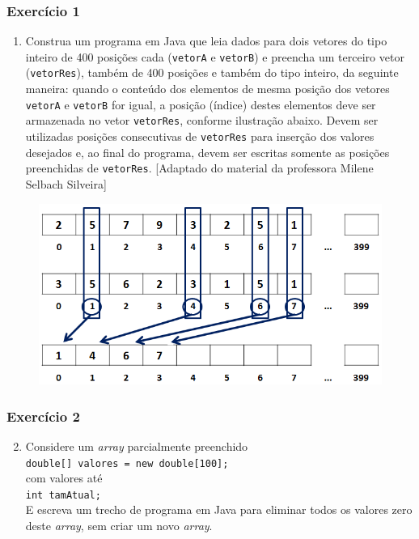 \documentclass[xcolor={dvipsnames,table},aspectratio=169]{beamer}
\begin{document}
\begin{frame}\frametitle{Exercício 1}
{\scriptsize
\begin{enumerate}
\item Construa um programa em Java que leia dados para dois vetores do tipo inteiro de 400 posições cada (\texttt{vetorA} e \texttt{vetorB}) e preencha um terceiro vetor (\texttt{vetorRes}), também de 400 posições e também do tipo inteiro, da seguinte maneira: quando o conteúdo dos elementos de mesma posição dos vetores \texttt{vetorA} e \texttt{vetorB} for igual, a posição (índice) destes elementos deve ser armazenada no vetor \texttt{vetorRes}, conforme ilustração abaixo. Devem ser utilizadas posições consecutivas de \texttt{vetorRes} para inserção dos valores desejados e, ao final do programa, devem ser escritas somente as posições preenchidas de \texttt{vetorRes}. [Adaptado do material da professora Milene Selbach Silveira]
\end{enumerate}
}
\begin{figure}[h]
	\includegraphics[height=0.40\paperheight,center]{pucrs-ep-fprog-unidade_06-arrays-laminas-exercicio.png}
\end{figure}
\end{frame}

\begin{frame}\frametitle{Exercício 2}
\begin{enumerate}
\setcounter{enumi}{1}
\item Considere um \emph{array} parcialmente preenchido\\
\texttt{double[] valores = new double[100];}\\
com valores até\\
\texttt{int tamAtual;}\\
E escreva um trecho de programa em Java para eliminar todos os valores zero deste \emph{array}, sem criar um novo \emph{array}.
\end{enumerate}
\end{frame}
\end{document}

